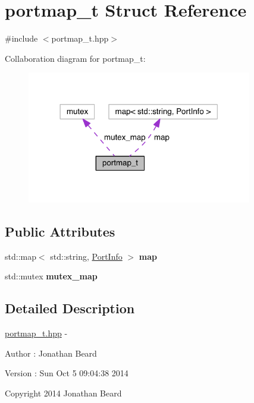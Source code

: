\hypertarget{structportmap__t}{}\section{portmap\+\_\+t Struct Reference}
\label{structportmap__t}


{\ttfamily \#include $<$portmap\+\_\+t.\+hpp$>$}



Collaboration diagram for portmap\+\_\+t\+:
\nopagebreak
\begin{figure}[H]
\begin{center}
\leavevmode
\includegraphics[width=278pt]{structportmap__t__coll__graph}
\end{center}
\end{figure}
\subsection*{Public Attributes}
\begin{DoxyCompactItemize}
\item 
\hypertarget{structportmap__t_a898d883add7b8dc54ceef7e4ef27c94f}{}\label{structportmap__t_a898d883add7b8dc54ceef7e4ef27c94f} 
std\+::map$<$ std\+::string, \hyperlink{struct_port_info}{Port\+Info} $>$ {\bfseries map}
\item 
\hypertarget{structportmap__t_a5ab8f09e8e5681b50388f0a2f0c23582}{}\label{structportmap__t_a5ab8f09e8e5681b50388f0a2f0c23582} 
std\+::mutex {\bfseries mutex\+\_\+map}
\end{DoxyCompactItemize}


\subsection{Detailed Description}
\hyperlink{portmap__t_8hpp_source}{portmap\+\_\+t.\+hpp} -\/ \begin{DoxyAuthor}{Author}
\+: Jonathan Beard 
\end{DoxyAuthor}
\begin{DoxyVersion}{Version}
\+: Sun Oct 5 09\+:04\+:38 2014
\end{DoxyVersion}
Copyright 2014 Jonathan Beard

